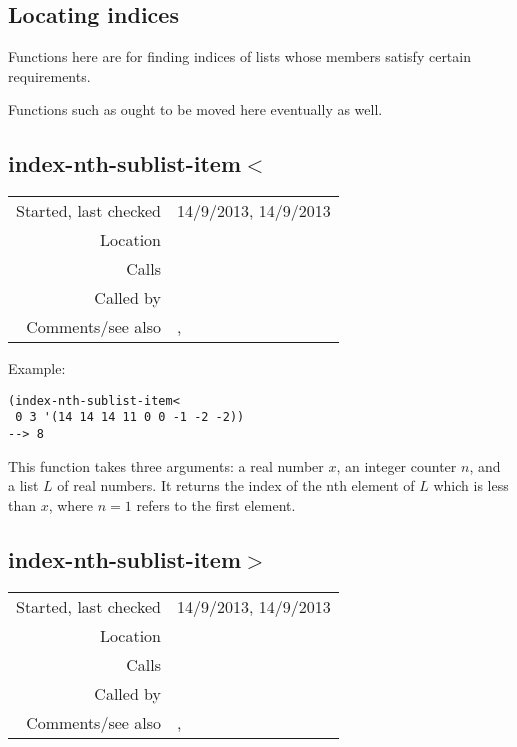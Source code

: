 \subsection{Locating indices}\label{sec:locating-indices}

Functions here are for finding indices of lists whose
members satisfy certain requirements.

Functions such as 
ought to be moved here eventually as well.


\subsection*{index-nth-sublist-item$<$}\label{fun:index-nth-sublist-item<}

\vspace{0.3cm}
\begin{tabular}{r|p{8cm}}
Started, last checked & 14/9/2013, 14/9/2013 \\
Location & \nameref{sec:locating-indices} \\
Calls & \\
Called by & \\
Comments/see also & \nameref{fun:index-1st-sublist-item<}, \newline \nameref{fun:index-nth-sublist-item<=}
\end{tabular}

\vspace{0.5cm}
\noindent Example:
\begin{verbatim}
(index-nth-sublist-item<
 0 3 '(14 14 14 11 0 0 -1 -2 -2))
--> 8
\end{verbatim}

\noindent This function takes three arguments: a real
number $x$, an integer counter $n$, and a list $L$ of
real numbers. It returns the index of the nth element
of $L$ which is less than $x$, where $n = 1$ refers to
the first element.


\subsection*{index-nth-sublist-item$>$}\label{fun:index-nth-sublist-item>}

\vspace{0.3cm}
\begin{tabular}{r|p{8cm}}
Started, last checked & 14/9/2013, 14/9/2013 \\
Location & \nameref{sec:locating-indices} \\
Calls & \\
Called by & \\
Comments/see also & \nameref{fun:index-1st-sublist-item>}, \newline \nameref{fun:index-nth-sublist-item>=}
\end{tabular}

